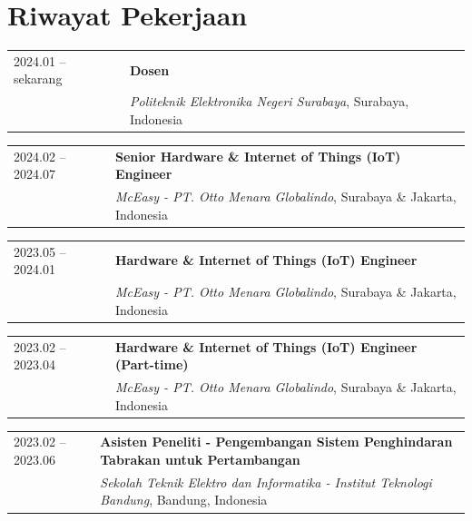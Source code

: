 \section{Riwayat Pekerjaan}

\noindent
\begin{tabularx}{\linewidth}{@{}l X@{}}
  2024.01 -- sekarang & \textbf{Dosen} \\
                              & \textit{Politeknik Elektronika Negeri Surabaya}, Surabaya, Indonesia \\
\end{tabularx}\vspace{4pt}

\noindent
\begin{tabularx}{\linewidth}{@{}l X@{}}
  2024.02 -- 2024.07 & \textbf{Senior Hardware \& Internet of Things (IoT) Engineer} \\
                              & \textit{McEasy - PT. Otto Menara Globalindo}, Surabaya \& Jakarta, Indonesia \\
\end{tabularx}\vspace{4pt}

\noindent
\begin{tabularx}{\linewidth}{@{}l X@{}}
  2023.05 -- 2024.01 & \textbf{Hardware \& Internet of Things (IoT) Engineer} \\
                              & \textit{McEasy - PT. Otto Menara Globalindo}, Surabaya \& Jakarta, Indonesia \\
\end{tabularx}\vspace{4pt}

\noindent
\begin{tabularx}{\linewidth}{@{}l X@{}}
  2023.02 -- 2023.04 & \textbf{Hardware \& Internet of Things (IoT) Engineer (Part-time)} \\
                              & \textit{McEasy - PT. Otto Menara Globalindo}, Surabaya \& Jakarta, Indonesia \\
\end{tabularx}\vspace{4pt}

\noindent
\begin{tabularx}{\linewidth}{@{}l X@{}}
  2023.02 -- 2023.06 & \textbf{Asisten Peneliti - Pengembangan Sistem Penghindaran Tabrakan untuk Pertambangan} \\
                              & \textit{Sekolah Teknik Elektro dan Informatika - Institut Teknologi Bandung}, Bandung, Indonesia \\
\end{tabularx}\vspace{4pt}


